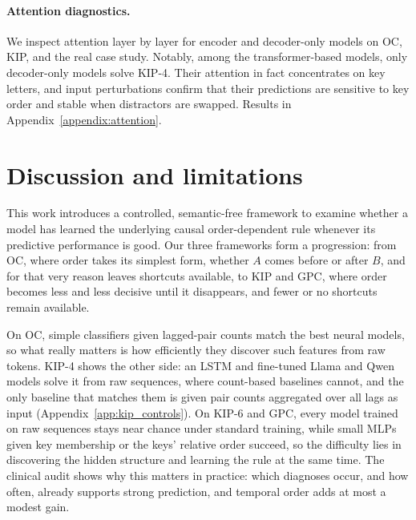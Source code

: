 \documentclass{article} %
\theoremstyle{plain}
\theoremstyle{definition}
\theoremstyle{remark}
\begin{document}
\paragraph{Attention diagnostics.}
We inspect attention layer by layer for encoder and decoder-only models on OC, KIP, and the real case study. Notably, among the transformer-based models, only decoder-only models solve KIP-4. Their attention in fact concentrates on key letters, and input perturbations confirm that their predictions are sensitive to key order and stable when distractors are swapped. Results in Appendix~\ref{appendix:attention}.

\section{Discussion and limitations}
\label{sec:limitations}
This work introduces a controlled, semantic-free framework to examine whether a model has learned the underlying causal order-dependent rule whenever its predictive performance is good. Our three frameworks form a progression: from OC, where order takes its simplest form, whether $A$ comes before or after $B$, and for that very reason leaves shortcuts available, to KIP and GPC, where order becomes less and less decisive until it disappears, and fewer or no shortcuts remain available. 

On OC, simple classifiers given lagged-pair counts match the best neural models, so what really matters is how efficiently they discover such features from raw tokens. KIP-4 shows the other side: an LSTM and fine-tuned Llama and Qwen models solve it from raw sequences, where count-based baselines cannot, and the only baseline that matches them is given pair counts aggregated over all lags as input (Appendix~\ref{app:kip_controls}). On KIP-6 and GPC, every model trained on raw sequences stays near chance under standard training, while small MLPs given key membership or the keys' relative order succeed, so the difficulty lies in discovering the hidden structure and learning the rule at the same time. The clinical audit shows why this matters in practice: which diagnoses occur, and how often, already supports strong prediction, and temporal order adds at most a modest gain.
\end{document}

